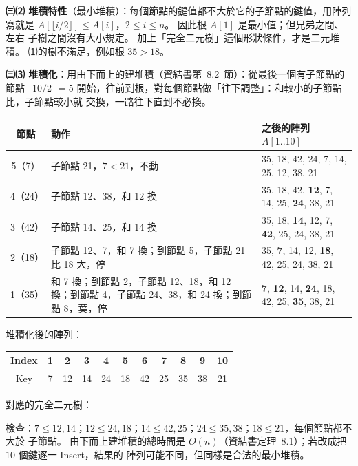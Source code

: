 \begin{pastsoln}
\textbf{㈢⑵ 堆積特性}（最小堆積）：每個節點的鍵值都不大於它的子節點的鍵值，用陣列寫就是
$A[\lfloor i/2 \rfloor] \le A[i]$，$2 \le i \le n$。 因此根 $A[1]$ 是最小值；但兄弟之間、左右
子樹之間沒有大小規定。 加上「完全二元樹」這個形狀條件，才是二元堆積。 ⑴的樹不滿足，例如根
$35 > 18$。

\textbf{㈢⑶ 堆積化}：用由下而上的建堆積（資結書第~8.2~節）：從最後一個有子節點的節點
$\lfloor 10/2 \rfloor = 5$ 開始，往前到根，對每個節點做「往下調整」：和較小的子節點比，子節點較小就
交換，一路往下直到不必換。
\begin{center}
\small
\begin{tabular}{cp{5.6cm}l}
\toprule
節點 & 動作 & 之後的陣列 $A[1..10]$ \\
\midrule
5（7） & 子節點 21，$7 < 21$，不動 & 35, 18, 42, 24, 7, 14, 25, 12, 38, 21 \\
4（24） & 子節點 12、38，和 12 換 & 35, 18, 42, \textbf{12}, 7, 14, 25, \textbf{24}, 38, 21 \\
3（42） & 子節點 14、25，和 14 換 & 35, 18, \textbf{14}, 12, 7, \textbf{42}, 25, 24, 38, 21 \\
2（18） & 子節點 12、7，和 7 換；到節點 5，子節點 21 比 18 大，停 & 35, \textbf{7}, 14, 12, \textbf{18}, 42, 25, 24, 38, 21 \\
1（35） & 和 7 換；到節點 2，子節點 12、18，和 12 換；到節點 4，子節點 24、38，和 24 換；到節點 8，葉，停 & \textbf{7}, \textbf{12}, 14, \textbf{24}, 18, 42, 25, \textbf{35}, 38, 21 \\
\bottomrule
\end{tabular}
\end{center}
堆積化後的陣列：
\begin{center}
\begin{tabular}{|c|c|c|c|c|c|c|c|c|c|c|}
\hline
Index & 1 & 2 & 3 & 4 & 5 & 6 & 7 & 8 & 9 & 10 \\ \hline
Key & 7 & 12 & 14 & 24 & 18 & 42 & 25 & 35 & 38 & 21 \\ \hline
\end{tabular}
\end{center}
對應的完全二元樹：
\begin{center}
\end{center}
檢查：$7 \le 12, 14$；$12 \le 24, 18$；$14 \le 42, 25$；$24 \le 35, 38$；$18 \le 21$，每個節點都不大於
子節點。 由下而上建堆積的總時間是 $O(n)$（資結書定理~8.1）；若改成把 $10$ 個鍵逐一 Insert，結果的
陣列可能不同，但同樣是合法的最小堆積。
\end{pastsoln}
